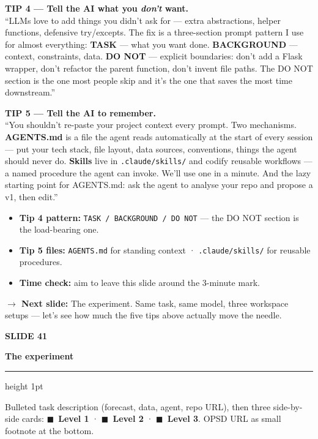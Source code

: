 \documentclass[11pt,a4paper]{article}
\newcommand{\slidehead}[2]{%
  \vspace{2pt}%
  {\small\color{mutedgrey}\textbf{SLIDE #1}}\par
  {\LARGE\color{jrcblue}\bfseries #2}\par
  \vspace{6pt}%
  {\color{jrcblue}\hrule height 1pt}%
  \vspace{8pt}%
}
\newcommand{\block}[1]{\par\vspace{4pt}{\small\color{jrcblue}\textbf{\MakeUppercase{#1}}}\par\vspace{2pt}}
\newenvironment{anchors}{%
  \begin{tcolorbox}[colback=jrcblue!6, colframe=jrcblue!50, boxrule=0.6pt, arc=2pt,
                    left=10pt, right=10pt, top=6pt, bottom=6pt, fontupper=\small,
                    title={\bfseries Anchor facts}, coltitle=jrcblue,
                    fonttitle=\small\bfseries, attach title to upper,
                    after title={\par\vspace{2pt}}]
}{%
  \end{tcolorbox}
}
\newenvironment{sayblock}{%
  \begin{tcolorbox}[colback=cardbg, colframe=jrcblue, boxrule=0.8pt, arc=2pt,
                    left=10pt, right=10pt, top=6pt, bottom=6pt, fontupper=\normalsize,
                    title={\bfseries Say this}, coltitle=white, colbacktitle=jrcblue,
                    fonttitle=\small\bfseries]
}{%
  \end{tcolorbox}
}
\newcommand{\transition}[1]{%
  \par\vspace{4pt}%
  \begin{tcolorbox}[colback=white, colframe=mutedgrey!40, boxrule=0.5pt, arc=2pt,
                    left=10pt, right=10pt, top=4pt, bottom=4pt, fontupper=\small]
    {\color{mutedgrey}\textbf{\textsf{$\to$ Next slide:}}} #1
  \end{tcolorbox}
}
\newcommand{\levelpill}[2]{\textcolor{#1}{$\blacksquare$}~\textbf{\textcolor{#1}{#2}}}
\begin{document}
\begin{sayblock}
\textbf{TIP 4 — Tell the AI what you \emph{don't} want.}\\
``LLMs love to add things you didn't ask for — extra abstractions, helper
functions, defensive try/excepts. The fix is a three-section prompt pattern I
use for almost everything: \textbf{TASK} — what you want done.
\textbf{BACKGROUND} — context, constraints, data. \textbf{DO NOT} — explicit
boundaries: don't add a Flask wrapper, don't refactor the parent function,
don't invent file paths. The DO NOT section is the one most people skip and
it's the one that saves the most time downstream.''\par\vspace{4pt}

\textbf{TIP 5 — Tell the AI to remember.}\\
``You shouldn't re-paste your project context every prompt. Two mechanisms.
\textbf{AGENTS.md} is a file the agent reads automatically at the start of
every session — put your tech stack, file layout, data sources, conventions,
things the agent should never do. \textbf{Skills} live in \texttt{.claude/skills/}
and codify reusable workflows — a named procedure the agent can invoke. We'll
use one in a minute. And the lazy starting point for AGENTS.md: ask the agent
to analyse your repo and propose a v1, then edit.''
\end{sayblock}

\begin{anchors}
\begin{itemize}
\item \textbf{Tip 4 pattern:} \texttt{TASK / BACKGROUND / DO NOT} — the DO NOT section is the load-bearing one.
\item \textbf{Tip 5 files:} \texttt{AGENTS.md} for standing context · \texttt{.claude/skills/} for reusable procedures.
\item \textbf{Time check:} aim to leave this slide around the 3-minute mark.
\end{itemize}
\end{anchors}

\transition{The experiment. Same task, same model, three workspace setups —
let's see how much the five tips above actually move the needle.}

\newpage

\slidehead{41}{The experiment}

\block{On screen}
Bulleted task description (forecast, data, agent, repo URL), then three
side-by-side cards: \levelpill{l1grey}{Level 1} · \levelpill{l2amber}{Level 2}
· \levelpill{l3orange}{Level 3}. OPSD URL as small footnote at the bottom.
\end{document}
